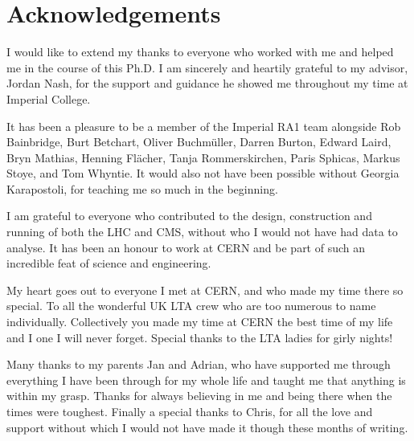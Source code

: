 \chapter*{Acknowledgements}


\normalsize

I would like to extend my thanks to everyone who worked with me and helped me in the course of this Ph.D. I am sincerely and heartily grateful to my advisor, Jordan Nash, for the support and guidance he showed me throughout my time at Imperial College.

It has been a pleasure to be a member of the Imperial RA1 team alongside Rob Bainbridge, Burt Betchart, Oliver Buchm\"uller, Darren Burton, Edward Laird, Bryn Mathias, Henning Fl\"acher, Tanja Rommerskirchen, Paris Sphicas, Markus Stoye, and Tom Whyntie. It would also not have been possible without Georgia Karapostoli, for teaching me so much in the beginning. 

I am grateful to everyone who contributed to the design, construction and running of both the LHC and CMS, without who I would not have had data to analyse. It has been an honour to work at CERN and be part of such an incredible feat of science and engineering.

My heart goes out to everyone I met at CERN, and who made my time there so special. To all the wonderful UK LTA crew who are too numerous to name individually. Collectively you made my time at CERN the best time of my life and I one I will never forget. Special thanks to the LTA ladies for girly nights! 

Many thanks to  my parents Jan and Adrian, who have supported me through everything I have been through for my whole life and taught me that anything is within my grasp. Thanks for always believing in me and being there when the times were toughest. Finally a special thanks to Chris, for all the love and support without which I would not have made it though these months of writing. 

